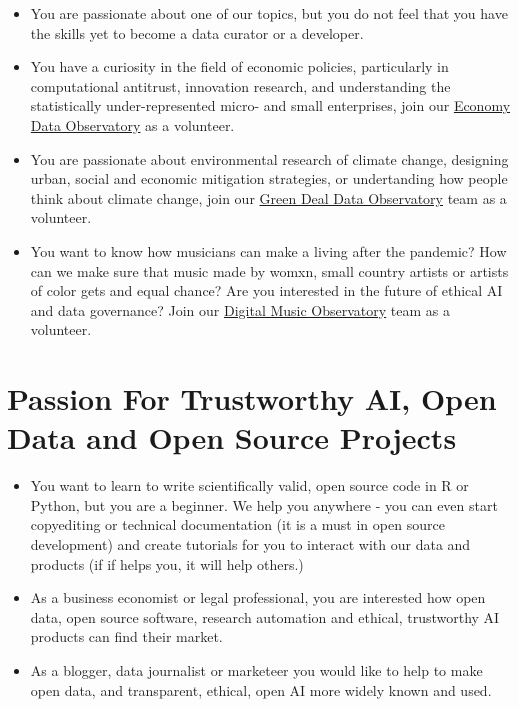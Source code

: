\documentclass[
  a4paper,
  openany, a4paper, oneside]{book}
\begin{document}
\begin{itemize}
\item
  You are passionate about one of our topics, but you do not feel that you have the skills yet to become a data curator or a developer.
\item
  You have a curiosity in the field of economic policies, particularly in computational antitrust, innovation research, and understanding the statistically under-represented micro- and small enterprises, join our \href{https://economy.dataobservatory.eu/\#contributors}{Economy Data Observatory} as a volunteer.
\item
  You are passionate about environmental research of climate change, designing urban, social and economic mitigation strategies, or undertanding how people think about climate change, join our \href{https://greendeal.dataobservatory.eu/\#contributors}{Green Deal Data Observatory} team as a volunteer.
\item
  You want to know how musicians can make a living after the pandemic? How can we make sure that music made by womxn, small country artists or artists of color gets and equal chance? Are you interested in the future of ethical AI and data governance? Join our \href{https://music.dataobservatory.eu/\#contributors}{Digital Music Observatory} team as a volunteer.
\end{itemize}

\hypertarget{open-associate}{%
\section{Passion For Trustworthy AI, Open Data and Open Source Projects}\label{open-associate}}

\begin{itemize}
\item
  You want to learn to write scientifically valid, open source code in R or Python, but you are a beginner. We help you anywhere - you can even start copyediting or technical documentation (it is a must in open source development) and create tutorials for you to interact with our data and products (if if helps you, it will help others.)
\item
  As a business economist or legal professional, you are interested how open data, open source software, research automation and ethical, trustworthy AI products can find their market.
\item
  As a blogger, data journalist or marketeer you would like to help to make open data, and transparent, ethical, open AI more widely known and used.
\end{itemize}
\end{document}
